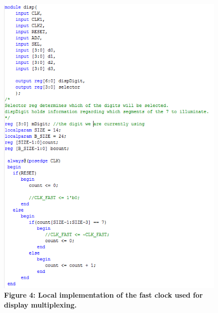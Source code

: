 \documentclass[journal]{IEEEtran}
\begin{document}
\begin{figure}[H]
	\centering\includegraphics[scale=0.6]{clkfast}
	\caption{\textbf{Figure 4: Local implementation of the fast clock used for display multiplexing.}}
\end{figure}
\end{document}
